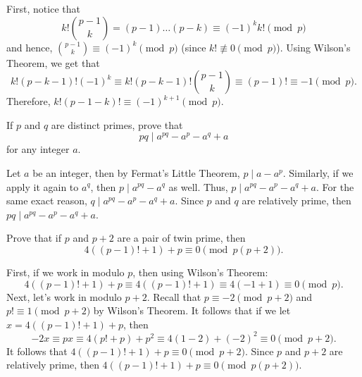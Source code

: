 \begin{solution}
    First, notice that
    $$k! \binom{p-1}{k} = (p-1)\dots(p-k) \equiv (-1)^k k! \pmod p$$
    and hence, $\binom{p-1}{k} \equiv (-1)^k \pmod p$ (since $k! \not\equiv 0 \pmod p$).
    Using Wilson's Theorem, we get that
    $$k!(p-k-1)!(-1)^k \equiv k!(p-k-1)!\binom{p-1}{k} \equiv (p-1)! \equiv -1 \pmod p.$$
    Therefore, $k!(p-1-k)! \equiv (-1)^{k+1} \pmod{p}$. \\
\end{solution}

\begin{exercise}
    If $p$ and $q$ are distinct primes, prove that
    $$pq \mid a^{pq} - a^p - a^q + a$$
    for any integer $a$. \\
\end{exercise}

\begin{solution}
    Let $a$ be an integer, then by Fermat's Little Theorem, $p \mid a - a^p$. Similarly, if we apply it again to $a^q$, then $p \mid a^{pq} - a^q$ as well. Thus, $p \mid a^{pq} - a^p - a^q + a$. For the same exact reason, $q \mid a^{pq} - a^p - a^q + a$. Since $p$ and $q$ are relatively prime, then $pq \mid a^{pq} - a^p - a^q + a$. \\
\end{solution}

\begin{exercise}
    Prove that if $p$ and $p+2$ are a pair of twin prime, then
    $$4((p-1)! + 1) + p \equiv 0 \pmod{p(p+2)}.$$
\end{exercise}

\begin{solution}
    First, if we work in modulo $p$, then using Wilson's Theorem:
    $$4((p-1)! + 1) + p \equiv 4((p-1)! + 1) \equiv 4(-1 + 1) \equiv 0 \pmod p.$$
    Next, let's work in modulo $p + 2$. Recall that $p \equiv -2 \pmod{p+2}$ and $p! \equiv 1 \pmod{p+2}$ by Wilson's Theorem. It follows that if we let $x = 4((p-1)! + 1) + p$, then
    $$-2x \equiv px \equiv 4(p! + p) + p^2 \equiv 4(1 - 2) + (-2)^2 \equiv 0 \pmod{p+2}.$$
    It follows that $4((p-1)! + 1) + p \equiv 0 \pmod{p+2}$. Since $p$ and $p+2$ are relatively prime, then $4((p-1)! + 1) + p \equiv 0 \pmod{p(p+2)}$.
\end{solution}